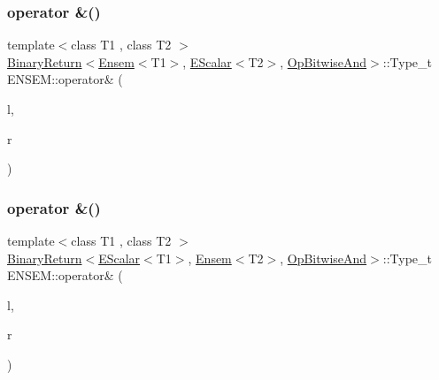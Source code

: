 \mbox{\label{namespaceENSEM_gadd38c6dbde8cad60658e2a3429480978}} 
\subsubsection{\texorpdfstring{operator \&()}{operator \&()}\hspace{0.1cm}{\footnotesize\ttfamily [6/7]}}
{\footnotesize\ttfamily template$<$class T1 , class T2 $>$ \\
\mbox{\hyperlink{structENSEM_1_1BinaryReturn}{Binary\+Return}}$<$\mbox{\hyperlink{classENSEM_1_1Ensem}{Ensem}}$<$T1$>$, \mbox{\hyperlink{classENSEM_1_1EScalar}{E\+Scalar}}$<$T2$>$, \mbox{\hyperlink{structENSEM_1_1OpBitwiseAnd}{Op\+Bitwise\+And}}$>$\+::Type\+\_\+t E\+N\+S\+E\+M\+::operator\& (\begin{DoxyParamCaption}\item[{const \mbox{\hyperlink{classENSEM_1_1Ensem}{Ensem}}$<$ T1 $>$ \&}]{l,  }\item[{const \mbox{\hyperlink{classENSEM_1_1EScalar}{E\+Scalar}}$<$ T2 $>$ \&}]{r }\end{DoxyParamCaption})\hspace{0.3cm}{\ttfamily [inline]}}

\mbox{\label{namespaceENSEM_ga81252fa8c928f420f2676e632c49a421}} 
\subsubsection{\texorpdfstring{operator \&()}{operator \&()}\hspace{0.1cm}{\footnotesize\ttfamily [7/7]}}
{\footnotesize\ttfamily template$<$class T1 , class T2 $>$ \\
\mbox{\hyperlink{structENSEM_1_1BinaryReturn}{Binary\+Return}}$<$\mbox{\hyperlink{classENSEM_1_1EScalar}{E\+Scalar}}$<$T1$>$, \mbox{\hyperlink{classENSEM_1_1Ensem}{Ensem}}$<$T2$>$, \mbox{\hyperlink{structENSEM_1_1OpBitwiseAnd}{Op\+Bitwise\+And}}$>$\+::Type\+\_\+t E\+N\+S\+E\+M\+::operator\& (\begin{DoxyParamCaption}\item[{const \mbox{\hyperlink{classENSEM_1_1EScalar}{E\+Scalar}}$<$ T1 $>$ \&}]{l,  }\item[{const \mbox{\hyperlink{classENSEM_1_1Ensem}{Ensem}}$<$ T2 $>$ \&}]{r }\end{DoxyParamCaption})\hspace{0.3cm}{\ttfamily [inline]}}

